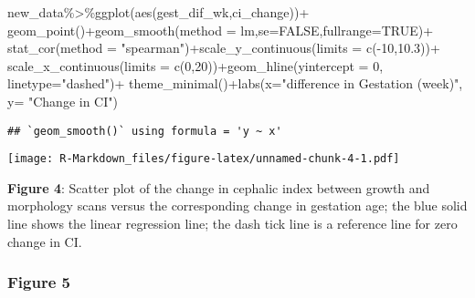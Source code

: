 \documentclass[
]{article}
\newenvironment{Shaded}{\begin{snugshade}}{\end{snugshade}}
\newcommand{\AttributeTok}[1]{\textcolor[rgb]{0.77,0.63,0.00}{#1}}
\newcommand{\ConstantTok}[1]{\textcolor[rgb]{0.00,0.00,0.00}{#1}}
\newcommand{\DecValTok}[1]{\textcolor[rgb]{0.00,0.00,0.81}{#1}}
\newcommand{\FloatTok}[1]{\textcolor[rgb]{0.00,0.00,0.81}{#1}}
\newcommand{\FunctionTok}[1]{\textcolor[rgb]{0.00,0.00,0.00}{#1}}
\newcommand{\NormalTok}[1]{#1}
\newcommand{\SpecialCharTok}[1]{\textcolor[rgb]{0.00,0.00,0.00}{#1}}
\newcommand{\StringTok}[1]{\textcolor[rgb]{0.31,0.60,0.02}{#1}}
\begin{document}
\begin{Shaded}
\begin{Highlighting}[]
\NormalTok{new\_data}\SpecialCharTok{\%\textgreater{}\%}\FunctionTok{ggplot}\NormalTok{(}\FunctionTok{aes}\NormalTok{(gest\_dif\_wk,ci\_change))}\SpecialCharTok{+}
  \FunctionTok{geom\_point}\NormalTok{()}\SpecialCharTok{+}\FunctionTok{geom\_smooth}\NormalTok{(}\AttributeTok{method =}\NormalTok{ lm,}\AttributeTok{se=}\ConstantTok{FALSE}\NormalTok{,}\AttributeTok{fullrange=}\ConstantTok{TRUE}\NormalTok{)}\SpecialCharTok{+}
  \FunctionTok{stat\_cor}\NormalTok{(}\AttributeTok{method =} \StringTok{"spearman"}\NormalTok{)}\SpecialCharTok{+}\FunctionTok{scale\_y\_continuous}\NormalTok{(}\AttributeTok{limits =} \FunctionTok{c}\NormalTok{(}\SpecialCharTok{{-}}\DecValTok{10}\NormalTok{,}\FloatTok{10.3}\NormalTok{))}\SpecialCharTok{+}
  \FunctionTok{scale\_x\_continuous}\NormalTok{(}\AttributeTok{limits =} \FunctionTok{c}\NormalTok{(}\DecValTok{0}\NormalTok{,}\DecValTok{20}\NormalTok{))}\SpecialCharTok{+}\FunctionTok{geom\_hline}\NormalTok{(}\AttributeTok{yintercept =} \DecValTok{0}\NormalTok{, }\AttributeTok{linetype=}\StringTok{"dashed"}\NormalTok{)}\SpecialCharTok{+}
  \FunctionTok{theme\_minimal}\NormalTok{()}\SpecialCharTok{+}\FunctionTok{labs}\NormalTok{(}\AttributeTok{x=}\StringTok{"difference in Gestation (week)"}\NormalTok{, }\AttributeTok{y=} \StringTok{"Change in CI"}\NormalTok{)}
\end{Highlighting}
\end{Shaded}

\begin{verbatim}
## `geom_smooth()` using formula = 'y ~ x'
\end{verbatim}

\texttt{[image: R-Markdown\_files/figure-latex/unnamed-chunk-4-1.pdf]}

\textbf{Figure 4}: Scatter plot of the change in cephalic index between
growth and morphology scans versus the corresponding change in gestation
age; the blue solid line shows the linear regression line; the dash tick
line is a reference line for zero change in CI.

\hypertarget{figure-5}{%
\subsubsection{\texorpdfstring{\textbf{Figure
5}}{Figure 5}}\label{figure-5}}
\end{document}
